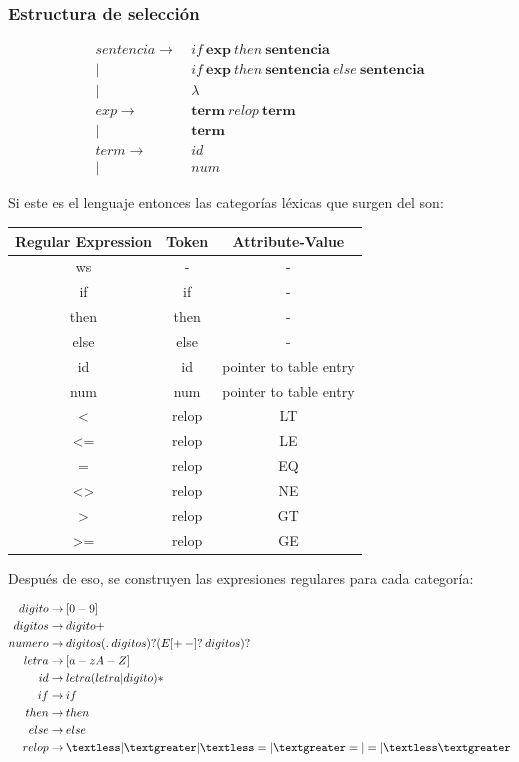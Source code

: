 \subsubsection{Estructura de selección}

\begin{align*}
    sentencia \rightarrow & \: if\:\textbf{exp}\:then\:\textbf{sentencia}\\
    \vert & \: if\:\textbf{exp}\:then\:\textbf{sentencia}\:else\:\textbf{sentencia} \\
    \vert & \: \lambda\\
    exp \rightarrow & \: \textbf{term}\:relop\:\textbf{term}\\
    \vert & \: \textbf{term}\\
    term \rightarrow & \: id \\
    \vert & \: num
\end{align*}

Si este es el lenguaje entonces las categorías léxicas que surgen del son:

\begin{table}[H]
\begin{tabular}{c|c|c}
Regular Expression & Token & Attribute-Value\\ \hline
ws & - & - \\
if & if & - \\
then & then & - \\
else & else & - \\
id & id & pointer to table entry \\
num & num & pointer to table entry \\
\textless & relop & LT \\
\textless = & relop & LE \\
= & relop & EQ \\
\textless\textgreater & relop & NE \\
\textgreater & relop & GT \\
\textgreater= & relop & GE \\
\end{tabular}
\end{table}

Después de eso, se construyen las expresiones regulares para cada categoría:

\begin{align*}
    digito \rightarrow & \: [0-9]\\
    digitos \rightarrow & \: digito+\\
    numero \rightarrow & \: digitos(.\:digitos)?(E[+\:-]?\:digitos)?\\
    letra \rightarrow & \: [a-zA-Z]\\
    id \rightarrow & \: letra(letra\vert digito)*\\
    if \rightarrow & \: if\\
    then \rightarrow & \: then\\
    else \rightarrow & \: else\\
    relop \rightarrow & \: \textless\vert\textgreater\vert\textless=\vert\textgreater=\vert=\vert\textless\textgreater \\
\end{align*}

